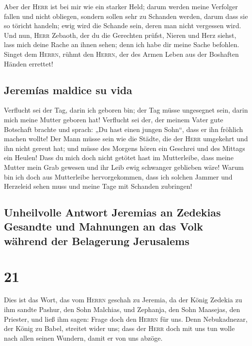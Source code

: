  Aber der \textsc{Herr} ist bei mir wie ein starker Held;
darum werden meine Verfolger fallen und nicht obliegen, sondern sollen
sehr zu Schanden werden, darum dass sie so töricht handeln; ewig wird
die Schande sein, deren man nicht vergessen wird.  Und
nun, \textsc{Herr} Zebaoth, der du die Gerechten prüfst, Nieren und Herz
siehst, lass mich deine Rache an ihnen sehen; denn ich habe dir meine
Sache befohlen.  Singet dem \textsc{Herrn}, rühmt den
\textsc{Herrn}, der des Armen Leben aus der Boshaften Händen errettet!

\hypertarget{jeremuxedas-maldice-su-vida}{%
\subsection{Jeremías maldice su
vida}\label{jeremuxedas-maldice-su-vida}}

 Verflucht sei der Tag, darin ich geboren bin; der Tag
müsse ungesegnet sein, darin mich meine Mutter geboren hat!
 Verflucht sei der, der meinem Vater gute Botschaft
brachte und sprach: „Du hast einen jungen Sohn``, dass er ihn fröhlich
machen wollte!  Der Mann müsse sein wie die Städte, die
der \textsc{Herr} umgekehrt und ihn nicht gereut hat; und müsse des
Morgens hören ein Geschrei und des Mittags ein Heulen! 
Dass du mich doch nicht getötet hast im Mutterleibe, dass meine Mutter
mein Grab gewesen und ihr Leib ewig schwanger geblieben wäre!
 Warum bin ich doch aus Mutterleibe hervorgekommen, dass
ich solchen Jammer und Herzeleid sehen muss und meine Tage mit Schanden
zubringen!

\hypertarget{unheilvolle-antwort-jeremias-an-zedekias-gesandte-und-mahnungen-an-das-volk-wuxe4hrend-der-belagerung-jerusalems}{%
\subsection{Unheilvolle Antwort Jeremias an Zedekias Gesandte und
Mahnungen an das Volk während der Belagerung
Jerusalems}\label{unheilvolle-antwort-jeremias-an-zedekias-gesandte-und-mahnungen-an-das-volk-wuxe4hrend-der-belagerung-jerusalems}}

\hypertarget{section-20}{%
\section{21}\label{section-20}}

 Dies ist das Wort, das vom \textsc{Herrn} geschah zu
Jeremia, da der König Zedekia zu ihm sandte Pashur, den Sohn Malchias,
und Zephanja, den Sohn Maasejas, den Priester, und ließ ihm sagen:
 Frage doch den \textsc{Herrn} für uns. Denn Nebukadnezar,
der König zu Babel, streitet wider uns; dass der \textsc{Herr} doch mit
uns tun wolle nach allen seinen Wundern, damit er von uns abzöge.

